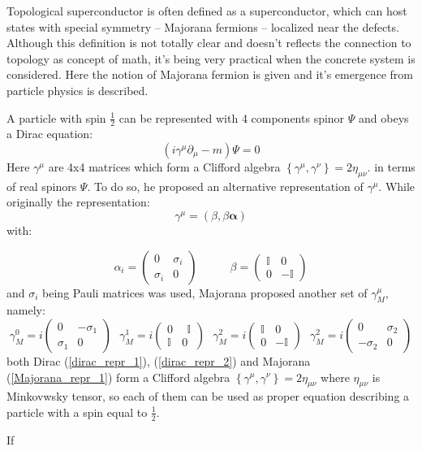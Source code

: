 Topological superconductor is often defined as a
superconductor, which can host states with special symmetry -- Majorana fermions -- localized near the defects. Although this definition is not totally clear and doesn't reflects the connection to topology as concept of math, it's being very practical when the concrete system is considered. Here the notion of Majorana fermion is given and it's emergence from particle physics is described.

A particle with spin $ \frac{1}{2} $ can be represented with 4 components spinor $ \Psi $ and obeys a Dirac equation:
\begin{equation}
	\left(
		i\gamma^\mu\partial_\mu - m 
	\right)
	\Psi
	=
	0
\end{equation}
Here $ \gamma^\mu $ are 4x4 matrices which form a Clifford algebra $ \left\{\gamma^\mu,\gamma^\nu \right\} = 2\eta_{\mu\nu} $.
in terms of real spinors $ \Psi $. To do so, he proposed an alternative representation of $ \gamma^\mu $. While originally the representation:
\begin{equation}
\label{dirac_repr_1}
	\gamma^\mu
	=
	\left(
		\beta, \beta \pmb{\alpha}
	\right)
\end{equation}
with:

\begin{equation}
\label{dirac_repr_2}
	\alpha_i 
	=
	\begin{pmatrix}
	 0 & \sigma_i \\
	 \sigma_i & 0
	\end{pmatrix}
	~~~~~~~~~~~~~
	\beta 
	=
	\begin{pmatrix}
	\mathbb{I} & 0 \\
	0      &  -\mathbb{I}
	\end{pmatrix}
\end{equation}
and $ \sigma_i $ being Pauli matrices was used, Majorana proposed another set of $ \gamma^\mu_M $, namely:
\begin{equation}
\label{Majorana_repr_1}
	\gamma^0_M
	=
	i
	\begin{pmatrix}
	0 & -\sigma_1 \\
	\sigma_1 & 0
	\end{pmatrix}
	~~~
	\gamma^1_M
	=
	i
	\begin{pmatrix}
	0 & ~~\mathbb{I} \\
	\mathbb{I} & 0
	\end{pmatrix}
	~~~
	\gamma^2_M
	=
	i
	\begin{pmatrix}
	\mathbb{I} & 0 \\
	0          & -\mathbb{I}
	\end{pmatrix}
	~~~
	\gamma^2_M
	=
	i
	\begin{pmatrix}
	0 & \sigma_2 \\
	-\sigma_2 & 0
	\end{pmatrix}	
\end{equation}
both Dirac (\ref{dirac_repr_1}), (\ref{dirac_repr_2}) and Majorana (\ref{Majorana_repr_1}) form a Clifford algebra $ \left\{\gamma^\mu,\gamma^\nu \right\} = 2\eta_{\mu\nu} $ where $ \eta_{\mu\nu} $
 is Minkovwsky tensor, so each of them can be used as proper equation describing a particle with a spin equal to $ \frac{1}{2} $.
 
 If 